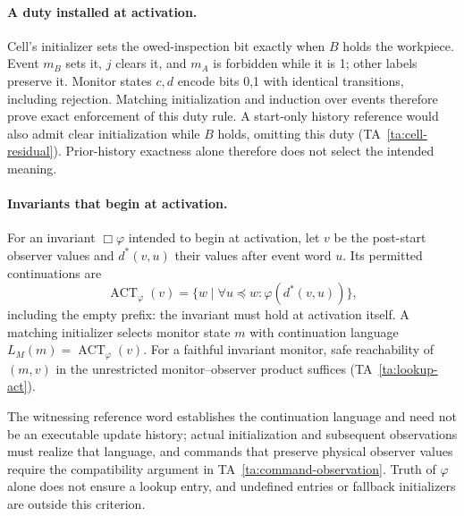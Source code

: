 \paragraph{A duty installed at activation.}\label{sec:cell-activation-duty}
Cell's initializer sets the owed-inspection bit exactly when $B$ holds the workpiece. Event $m_B$ sets it, $j$ clears it, and $m_A$ is forbidden while it is 1; other labels preserve it. Monitor states $c,d$ encode bits 0,1 with identical transitions, including rejection. Matching initialization and induction over events therefore prove exact enforcement of this duty rule. A start-only history reference would also admit clear initialization while $B$ holds, omitting this duty (TA~\ref{ta:cell-residual}). Prior-history exactness alone therefore does not select the intended meaning.

\paragraph{Invariants that begin at activation.}\label{sec:activation-scoped-main}
For an invariant $\Box\varphi$ intended to begin at activation, let $v$ be the post-start observer values and $d^*(v,u)$ their values after event word $u$. Its permitted continuations are
\[
 \operatorname{ACT}_\varphi(v)=\{w\mid\forall u\preceq w:\varphi(d^*(v,u))\},
\]
including the empty prefix: the invariant must hold at activation itself. A matching initializer selects monitor state $m$ with continuation language $L_M(m)=\operatorname{ACT}_\varphi(v)$. For a faithful invariant monitor, safe reachability of $(m,v)$ in the unrestricted monitor--observer product suffices (TA~\ref{ta:lookup-act}).

The witnessing reference word establishes the continuation language and need not be an executable update history; actual initialization and subsequent observations must realize that language, and commands that preserve physical observer values require the compatibility argument in TA~\ref{ta:command-observation}. Truth of $\varphi$ alone does not ensure a lookup entry, and undefined entries or fallback initializers are outside this criterion.
